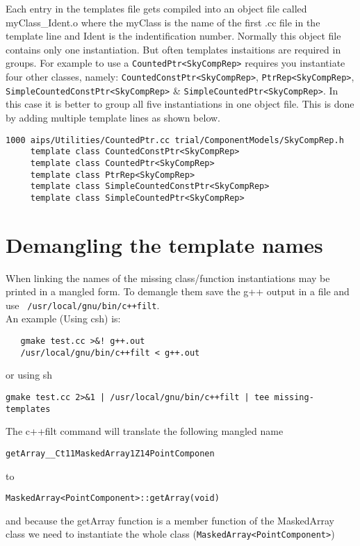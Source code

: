 Each entry in the templates file gets compiled into an object file
called myClass\_Ident.o where the myClass is the name of the first .cc
file in the template line and Ident is the indentification number.
Normally this object file contains only one instantiation. But often
templates instaitions are required in groups. For example to use a
\verb!CountedPtr<SkyCompRep>! requires you instantiate four other
classes, namely: \verb!CountedConstPtr<SkyCompRep>!,
\verb!PtrRep<SkyCompRep>!, \verb!SimpleCountedConstPtr<SkyCompRep>! \&
\verb!SimpleCountedPtr<SkyCompRep>!. In this case it is better to
group all five instantiations in one object file. This is done by
adding multiple template lines as shown below. 
\begin{verbatim}
1000 aips/Utilities/CountedPtr.cc trial/ComponentModels/SkyCompRep.h 
     template class CountedConstPtr<SkyCompRep> 
     template class CountedPtr<SkyCompRep> 
     template class PtrRep<SkyCompRep> 
     template class SimpleCountedConstPtr<SkyCompRep> 
     template class SimpleCountedPtr<SkyCompRep> 
\end{verbatim}

\section{Demangling the template names}
When linking the names of the missing class/function instantiations may
be printed in a mangled form. 
To demangle them save the g++ output in a
file and use \texttt{ /usr/local/gnu/bin/c++filt}. \\
An example (Using csh) is:
\begin{verbatim}
   gmake test.cc >&! g++.out
   /usr/local/gnu/bin/c++filt < g++.out
\end{verbatim}
or using sh 
\begin{verbatim}
gmake test.cc 2>&1 | /usr/local/gnu/bin/c++filt | tee missing-templates
\end{verbatim}

The c++filt command will translate the following mangled name
\begin{verbatim}
getArray__Ct11MaskedArray1Z14PointComponen
\end{verbatim}
to
\begin{verbatim}
MaskedArray<PointComponent>::getArray(void) 
\end{verbatim}
and because the getArray function is a member function of the MaskedArray
class we need to instantiate the whole class 
(\texttt{MaskedArray<PointComponent>})

